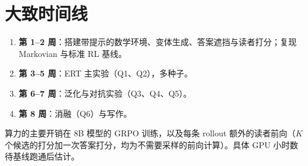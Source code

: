 \documentclass[11pt,a4paper]{ctexart}
\begin{document}
\section{大致时间线}
\begin{enumerate}
\item \textbf{第 1--2 周}：搭建带提示的数学环境、变体生成、答案遮挡与读者打分；复现 Markovian 与标准 RL 基线。
\item \textbf{第 3--5 周}：ERT 主实验（Q1、Q2），多种子。
\item \textbf{第 6--7 周}：泛化与对抗实验（Q3、Q4、Q5）。
\item \textbf{第 8 周}：消融（Q6）与写作。
\end{enumerate}
算力的主要开销在 8B 模型的 GRPO 训练，以及每条 rollout 额外的读者前向（$K$ 个候选的打分加一次答案打分，均为不需要采样的前向计算）。具体 GPU 小时数待基线跑通后估计。
\end{document}
